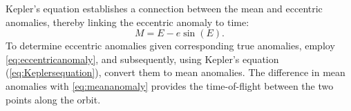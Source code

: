 Kepler's equation establishes a connection between the mean and eccentric anomalies, thereby
linking the eccentric anomaly to time:
\begin{equation}
    M=E-e\sin(E).
    \label{eq:Keplersequation}
\end{equation}
To determine eccentric anomalies given corresponding true anomalies, employ
\cref{eq:eccentricanomaly}, and subsequently, using Kepler's equation (\cref{eq:Keplersequation}),
convert them to mean anomalies. The difference in mean anomalies with \cref{eq:meananomaly}
provides the time-of-flight between the two points along the orbit.
